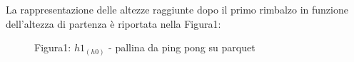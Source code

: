 \documentclass[a4paper]{article}
\theoremstyle{definition}
\begin{document}
	\begin{figure}[!htbp]
	\end{figure}
	
	\noindent La rappresentazione delle altezze raggiunte dopo il primo rimbalzo in funzione dell'altezza di partenza è riportata nella Figura1:
	\begin{figure}[!ht]
		\captionsetup{labelformat=empty}
		\caption{Figura1: \(h1_{(h0)}\) - pallina da ping pong su parquet}
	\end{figure}
	
\end{document}
